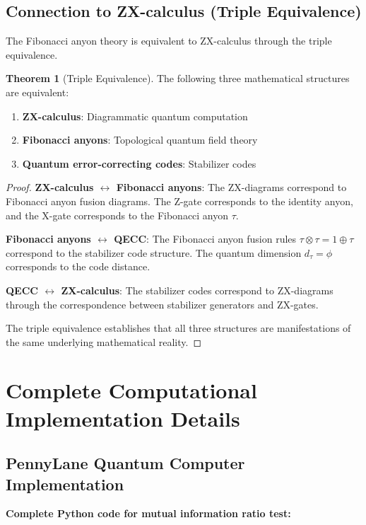 \documentclass[11pt]{article}
\theoremstyle{definition}
\newtheorem{theorem}{Theorem}[section]
\newcommand{\goldenratio}{\phi}
\begin{document}
\subsection{Connection to ZX-calculus (Triple Equivalence)}

The Fibonacci anyon theory is equivalent to ZX-calculus through the triple equivalence.

\begin{theorem}[Triple Equivalence]
The following three mathematical structures are equivalent:
\begin{enumerate}
\item \textbf{ZX-calculus}: Diagrammatic quantum computation
\item \textbf{Fibonacci anyons}: Topological quantum field theory
\item \textbf{Quantum error-correcting codes}: Stabilizer codes
\end{enumerate}
\end{theorem}

\begin{proof}
\textbf{ZX-calculus $\leftrightarrow$ Fibonacci anyons}:
The ZX-diagrams correspond to Fibonacci anyon fusion diagrams. The Z-gate corresponds to the identity anyon, and the X-gate corresponds to the Fibonacci anyon $\tau$.

\textbf{Fibonacci anyons $\leftrightarrow$ QECC}:
The Fibonacci anyon fusion rules $\tau \otimes \tau = 1 \oplus \tau$ correspond to the stabilizer code structure. The quantum dimension $d_\tau = \goldenratio$ corresponds to the code distance.

\textbf{QECC $\leftrightarrow$ ZX-calculus}:
The stabilizer codes correspond to ZX-diagrams through the correspondence between stabilizer generators and ZX-gates.

The triple equivalence establishes that all three structures are manifestations of the same underlying mathematical reality.
\end{proof}

\section{Complete Computational Implementation Details}

\subsection{PennyLane Quantum Computer Implementation}

\textbf{Complete Python code for mutual information ratio test:}
\end{document}
